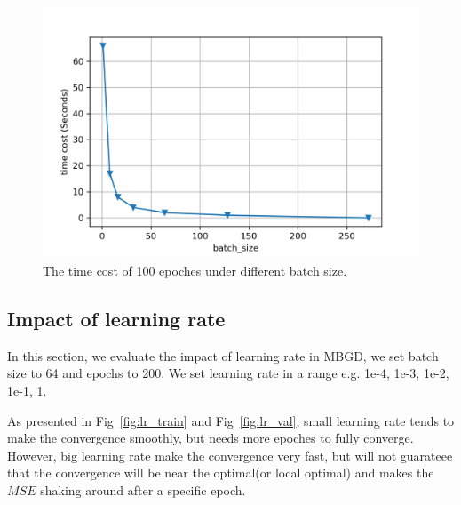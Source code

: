\documentclass[journal, a4paper]{IEEEtran}
\begin{document}
\begin{figure}[!hbt]
	\begin{center}
		\includegraphics[width=\columnwidth]{time_cost}
		\caption{The time cost of 100 epoches under different batch size.}
		\label{fig:time_cost}
	\end{center}
\end{figure} 

\subsection{Impact of learning rate}
In this section, we evaluate the impact of learning rate in MBGD, we set batch size to 64 and epochs to 200. We set learning rate in a range e.g. 1e-4, 1e-3, 1e-2, 1e-1, 1. \par
As presented in Fig~\ref{fig:lr_train} and Fig~\ref{fig:lr_val}, small learning rate tends to make the convergence smoothly, but needs more epoches to fully converge. However, big learning rate make the convergence very fast, but will not guarateee that the convergence will be near the optimal(or local optimal) and makes the $MSE$ shaking around after a specific epoch.  \par
\end{document}
